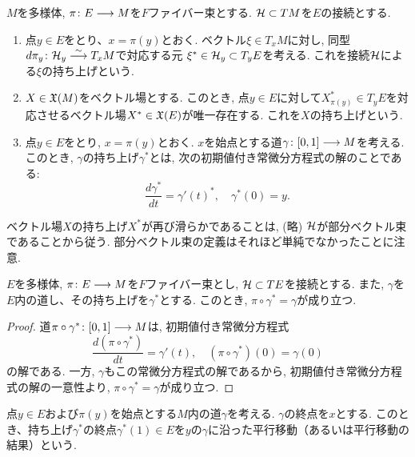 \begin{dfn}[持ち上げ]
$M$を多様体, $\pi \colon E \longrightarrow M$を$F$ファイバー束とする.
$\mathcal{H} \subset TM$を$E$の接続とする.
\begin{enumerate}
\item
点$y \in E$をとり、$x = \pi(y)$とおく.
ベクトル$\xi \in T_xM$に対し, 同型$d\pi_y \colon \mathcal{H}_y \stackrel{\sim}{\longrightarrow} T_xM$で対応する元
$\xi^* \in \mathcal{H}_y \subset T_yE$を考える.
これを接続$\mathcal{H}$による$\xi$の持ち上げという.
\item
$X \in \mathfrak{X}(M)$をベクトル場とする.
このとき, 点$y \in E$に対して$X_{\pi(y)}^* \in T_yE$を対応させるベクトル場$X^* \in \mathfrak{X}(E)$が唯一存在する.
これを$X$の持ち上げという.
\item
点$y \in E$をとり, $x = \pi(y)$とおく.
$x$を始点とする道$\gamma \colon [0,1] \longrightarrow M$を考える.
このとき, $\gamma$の持ち上げ$\gamma^*$とは, 次の初期値付き常微分方程式の解のことである:
\begin{equation}
\frac{d\gamma^*}{dt} = \gamma'(t)^*, \quad
\gamma^*(0) = y.
\end{equation}
\end{enumerate}
\end{dfn}

\begin{rem}
ベクトル場$X$の持ち上げ$X^*$が再び滑らかであることは, (略)
$\mathcal{H}$が部分ベクトル束であることから従う.
部分ベクトル束の定義はそれほど単純でなかったことに注意.
\end{rem}

\begin{lem}
$E$を多様体, $\pi \colon E \longrightarrow M$を$F$ファイバー束とし,
$\mathcal{H} \subset TE$を接続とする.
また, $\gamma$を$E$内の道し、その持ち上げを$\gamma^*$とする.
このとき, $\pi \circ \gamma^* = \gamma$が成り立つ.
\end{lem}

\begin{proof}
道$\pi \circ \gamma^* \colon [0,1] \longrightarrow M$は, 初期値付き常微分方程式
\begin{equation}
\frac{d(\pi \circ \gamma^*)}{dt} = \gamma'(t), \quad
(\pi \circ \gamma^*)(0) = \gamma(0)
\end{equation}
の解である.
一方, $\gamma$もこの常微分方程式の解であるから, 初期値付き常微分方程式の解の一意性より, $\pi \circ \gamma^* = \gamma$が成り立つ.
\end{proof}

\begin{dfn}[平行移動]
点$y \in E$および$\pi(y)$を始点とする$M$内の道$\gamma$を考える.
$\gamma$の終点を$x$とする.
このとき、持ち上げ$\gamma^*$の終点$\gamma^*(1) \in E$を$y$の$\gamma$に沿った平行移動（あるいは平行移動の結果）という.
\end{dfn}

